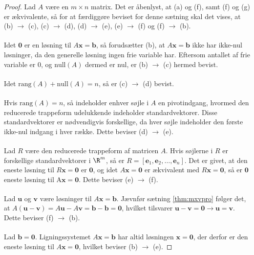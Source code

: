 \begin{proof}
Lad $A$ være en $m \times n$ matrix.
Det er åbenlyst, at (a) og (f), samt (f) og (g) er ækvivalente, så for at færdiggøre beviset for denne sætning skal det vises, at (b) $\rightarrow$ (c), (c) $\rightarrow$ (d), (d) $\rightarrow$ (e), (e) $\rightarrow$ (f) og (f) $\rightarrow$ (b).
\\\\
Idet $\mathbf{0}$ er en løsning til $A\mathbf{x}=\mathbf{b}$, så forudsætter (b), at $A\mathbf{x}=\mathbf{b}$ ikke har ikke-nul løsninger, da den generelle løsning ingen frie variable har. 
Eftersom antallet af frie variable er $0$, og $\text{null}(A)$ dermed er nul, er (b) $\rightarrow$ (c) hermed bevist. 
\\\\
Idet $\text{rang}(A)+\text{null}(A)=n$, så er (c) $\rightarrow$ (d) bevist.
\\\\
%
Hvis $\text{rang}(A)=n$, så indeholder enhver søjle i $A$ en pivotindgang, hvormed den reducerede trappeform udelukkende indeholder standardvektorer. 
Disse standardvektorer er nødvendigvis forskellige, da hver søjle indeholder den første ikke-nul indgang i hver række. 
Dette beviser (d) $\rightarrow$ (e).
%
\\\\
Lad $R$ være den reducerede trappeform af matricen $A$. Hvis søjlerne i $R$ er forskellige standardvektorer i $\R^m$, så er $R= [ \mathbf{e}_1, \mathbf{e}_2, \ldots, \mathbf{e}_n]$. 
Det er givet, at den eneste løsning til $R\mathbf{x}=\mathbf{0}$ er $\mathbf{0}$, og idet $A\mathbf{x}=\mathbf{0}$ er ækvivalent med $R\mathbf{x}=\mathbf{0}$, så er $\mathbf{0}$ eneste løsning til A$\mathbf{x}=\mathbf{0}$. 
Dette beviser (e) $\rightarrow$ (f).
\\\\
%
Lad $\mathbf{u}$ og $\mathbf{v}$ være løsninger til $A\mathbf{x}=\mathbf{b}$.
Jævnfør sætning \ref{thm:mxvpro} følger det, at $A(\mathbf{u}-\mathbf{v})=A\mathbf{u}-A\mathbf{v}=\mathbf{b}-\mathbf{b}=\mathbf{0}$, hvilket tilsvarer $\mathbf{u}-\mathbf{v}=\mathbf{0}
\rightarrow  
\mathbf{u} =\mathbf{v}$. Dette beviser (f) $\rightarrow$ (b).
\\\\
%
Lad $\mathbf{b}=\mathbf{0}$. 
Ligningssystemet $A\mathbf{x}=\mathbf{b}$ har altid løsningen $\mathbf{x}=\mathbf{0}$, der derfor er den eneste løsning til $A\mathbf{x}=\mathbf{0}$, hvilket beviser (b) $\rightarrow$ (e).
%
\end{proof}
